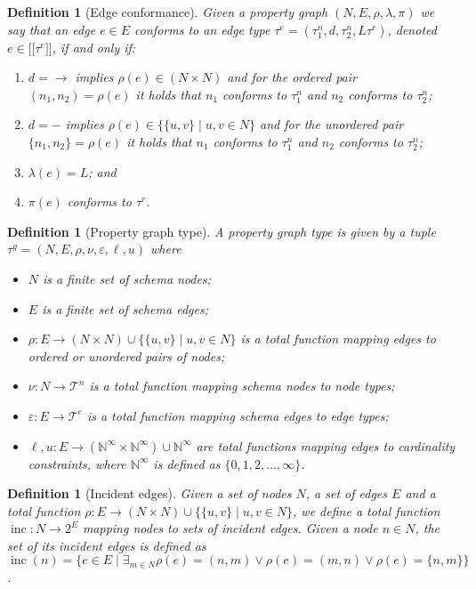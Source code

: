 \documentclass[a4paper]{article}
\newtheorem{definition}[theorem]{Definition}
\newcommand{\N}{\mathbb{N}}
\newcommand{\rtype}{\tau^r}
\newcommand{\ntype}{\tau^n}
\newcommand{\ntypes}{\mathcal{T}^n}
\newcommand{\etype}{\tau^e}
\newcommand{\etypes}{\mathcal{T}^e}
\newcommand{\gtype}{\tau^g}
\newcommand{\lsem}{\ensuremath{[\![}}
\newcommand{\rsem}{\ensuremath{]\!]}}
\newcommand{\sem}[1]{\ensuremath{\lsem #1 \rsem}}
\DeclareMathOperator{\inc}{inc}
\begin{document}
\begin{definition}[Edge conformance]
  Given a property graph $(N, E, \rho, \lambda, \pi)$ we say that an edge $e \in E$ \emph{conforms} to an edge type $\etype = (\ntype_1, d, \ntype_2, L\rtype)$, denoted $e \in \sem{\etype}$, if and only if:
  \begin{enumerate}
    \item $d = \rightarrow$ implies $\rho(e) \in (N \times N)$ and for the ordered pair $(n_1, n_2) = \rho(e)$ it holds that $n_1$ conforms to $\ntype_1$ and $n_2$ conforms to $\ntype_2$;
    \item $d = -$ implies $\rho(e) \in \{\{u, v\} \mid u, v \in N\}$ and for the unordered pair $\{n_1, n_2\} = \rho(e)$ it holds that $n_1$ conforms to $\ntype_1$ and $n_2$ conforms to $\ntype_2$;
    \item $\lambda(e) = L$; and
    \item $\pi(e)$ conforms to $\rtype$.
  \end{enumerate}
\end{definition}

\begin{definition}[Property graph type]
  A \emph{property graph type} is given by a tuple $\gtype = (N, E, \rho, \nu, \varepsilon, \ell, u)$ where 
  \begin{itemize}
    \item $N$ is a finite set of schema nodes;
    \item $E$ is a finite set of schema edges;
    \item $\rho : E \to (N \times N) \cup \{\{u, v\} \mid u, v \in N\}$ is a total function mapping edges to ordered or unordered pairs of nodes;
    \item $\nu : N \to \ntypes$ is a total function mapping schema nodes to node types;
    \item $\varepsilon : E \to \etypes$ is a total function mapping schema edges to edge types;
    \item $\ell, u : E \to (\N^\infty \times \N^\infty) \cup \N^\infty$ are total functions mapping edges to cardinality constraints, where $\N^\infty$ is defined as $\{0, 1, 2, \ldots, \infty\}$.
  \end{itemize}
\end{definition}

\begin{definition}[Incident edges]
  Given a set of nodes $N$, a set of edges $E$ and a total function $\rho : E \to (N \times N) \cup \{\{u, v\} \mid u, v \in N\}$, we define a total function $\inc : N \to 2^E$ mapping nodes to sets of \emph{incident edges}. Given a node $n \in N$, the set of its incident edges is defined as $\inc(n) = \{e \in E \mid \exists_{m \in N} \rho(e) = (n, m) \vee \rho(e) = (m, n) \vee \rho(e) = \{n, m\}\}$.
\end{definition}
\end{document}
